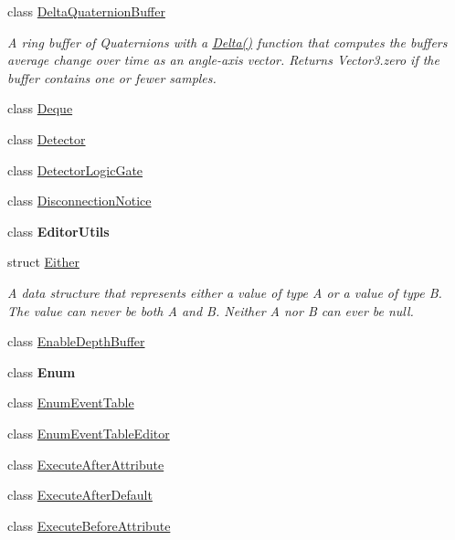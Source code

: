 \begin{DoxyCompactItemize}
class \mbox{\hyperlink{class_leap_1_1_unity_1_1_delta_quaternion_buffer}{Delta\+Quaternion\+Buffer}}
\begin{DoxyCompactList}\small\item\em A ring buffer of Quaternions with a \mbox{\hyperlink{class_leap_1_1_unity_1_1_delta_quaternion_buffer_a4e3c9ef1beee10efb295719e81cdf766}{Delta()}} function that computes the buffer\textquotesingle{}s average change over time as an angle-\/axis vector. Returns Vector3.\+zero if the buffer contains one or fewer samples. \end{DoxyCompactList}\item 
class \mbox{\hyperlink{class_leap_1_1_unity_1_1_deque}{Deque}}
\item 
class \mbox{\hyperlink{class_leap_1_1_unity_1_1_detector}{Detector}}
\item 
class \mbox{\hyperlink{class_leap_1_1_unity_1_1_detector_logic_gate}{Detector\+Logic\+Gate}}
\item 
class \mbox{\hyperlink{class_leap_1_1_unity_1_1_disconnection_notice}{Disconnection\+Notice}}
\item 
class {\bfseries Editor\+Utils}
\item 
struct \mbox{\hyperlink{struct_leap_1_1_unity_1_1_either}{Either}}
\begin{DoxyCompactList}\small\item\em A data structure that represents either a value of type A or a value of type B. The value can never be both A and B. Neither A nor B can ever be null. \end{DoxyCompactList}\item 
class \mbox{\hyperlink{class_leap_1_1_unity_1_1_enable_depth_buffer}{Enable\+Depth\+Buffer}}
\item 
class {\bfseries Enum}
\item 
class \mbox{\hyperlink{class_leap_1_1_unity_1_1_enum_event_table}{Enum\+Event\+Table}}
\item 
class \mbox{\hyperlink{class_leap_1_1_unity_1_1_enum_event_table_editor}{Enum\+Event\+Table\+Editor}}
\item 
class \mbox{\hyperlink{class_leap_1_1_unity_1_1_execute_after_attribute}{Execute\+After\+Attribute}}
\item 
class \mbox{\hyperlink{class_leap_1_1_unity_1_1_execute_after_default}{Execute\+After\+Default}}
\item 
class \mbox{\hyperlink{class_leap_1_1_unity_1_1_execute_before_attribute}{Execute\+Before\+Attribute}}
\item 

\end{DoxyCompactItemize}

